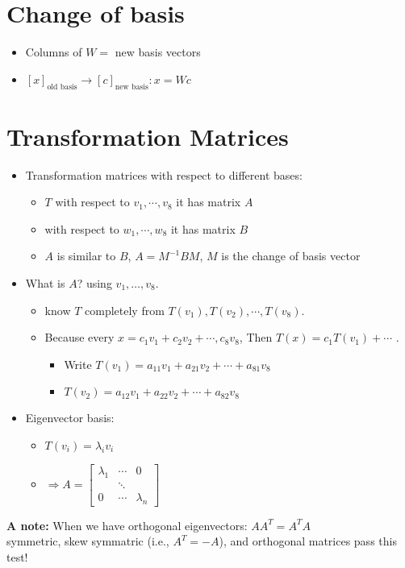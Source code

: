 \documentclass[a4paper,12pt]{article}
\theoremstyle{definition} \newtheorem{Theorem}{Theorem}
\begin{document}
\section{Change of basis}
\begin{itemize}
\item Columns of $W =$ new basis vectors
\item $[x]_{\text{old basis}} \rightarrow [c]_{\text{new basis}}: x = W c$
\end{itemize}
\section{Transformation Matrices}
\begin{itemize}
\item Transformation matrices with respect to different bases:
\begin{itemize}
\item $T$ with respect to $v_1,\cdots, v_8$ it has matrix $A$
\item with respect to $w_1,\cdots, w_8$ it has matrix $B$
\item $A$ is similar to $B$, $A = M^{-1} B M$, $M$ is the change of basis vector
\end{itemize}
\item What is $A$? using $v_1, \ldots, v_8$.
\begin{itemize}
\item know $T$ completely from $T(v_1), T(v_2), \cdots, T(v_8)$.
\item Because every $x = c_1 v_1 + c_2 v_2 + \cdots, c_8 v_8$, Then $T(x) = c_1 T(v_1)  + \cdots$ .
\begin{itemize}
\item Write $T(v_1) = a_{11} v_1 + a_{21} v_2 + \cdots + a_{81} v_8$
\item $T(v_2) = a_{12} v_1 + a_{22} v_2 + \cdots + a_{82} v_8$
\end{itemize}
\end{itemize}
\item Eigenvector basis:
\begin{itemize}
\item $T(v_i) = \lambda_i v_i$
\item $\Rightarrow A = \begin{bmatrix}\lambda_1 & \cdots & 0 \\ & \ddots & \\ 0 & \cdots & \lambda_n \end{bmatrix}$
\end{itemize}
\end{itemize}
\textbf{A note:} When we have orthogonal eigenvectors: $A A^T = A^T A$ \\
symmetric, skew symmatric (i.e., $A^T = -A$), and orthogonal matrices pass this test!
\end{document}
